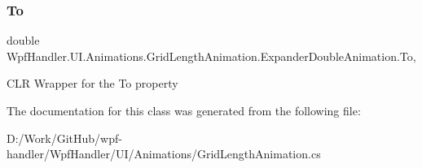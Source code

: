 \subsubsection{\texorpdfstring{To}{To}}
{\footnotesize\ttfamily double Wpf\+Handler.\+U\+I.\+Animations.\+Grid\+Length\+Animation.\+Expander\+Double\+Animation.\+To\hspace{0.3cm}{\ttfamily [get]}, {\ttfamily [set]}}



C\+LR Wrapper for the To property 



The documentation for this class was generated from the following file\+:\begin{DoxyCompactItemize}
\item 
D\+:/\+Work/\+Git\+Hub/wpf-\/handler/\+Wpf\+Handler/\+U\+I/\+Animations/Grid\+Length\+Animation.\+cs\end{DoxyCompactItemize}
